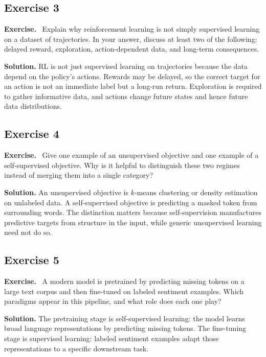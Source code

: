 \documentclass[11pt]{article}
\newenvironment{exercisebox}{\begin{framed}\noindent\textbf{Exercise.}\ }{\end{framed}}
\begin{document}
\subsection*{Exercise 3}
\begin{exercisebox}
Explain why reinforcement learning is not simply supervised learning on a dataset of trajectories. In your answer, discuss at least two of the following: delayed reward, exploration, action-dependent data, and long-term consequences.
\end{exercisebox}
\textbf{Solution.} RL is not just supervised learning on trajectories because the data depend on the policy's actions. Rewards may be delayed, so the correct target for an action is not an immediate label but a long-run return. Exploration is required to gather informative data, and actions change future states and hence future data distributions.

\subsection*{Exercise 4}
\begin{exercisebox}
Give one example of an unsupervised objective and one example of a self-supervised objective. Why is it helpful to distinguish these two regimes instead of merging them into a single category?
\end{exercisebox}
\textbf{Solution.} An unsupervised objective is $k$-means clustering or density estimation on unlabeled data. A self-supervised objective is predicting a masked token from surrounding words. The distinction matters because self-supervision manufactures predictive targets from structure in the input, while generic unsupervised learning need not do so.

\subsection*{Exercise 5}
\begin{exercisebox}
A modern model is pretrained by predicting missing tokens on a large text corpus and then fine-tuned on labeled sentiment examples. Which paradigms appear in this pipeline, and what role does each one play?
\end{exercisebox}
\textbf{Solution.} The pretraining stage is self-supervised learning: the model learns broad language representations by predicting missing tokens. The fine-tuning stage is supervised learning: labeled sentiment examples adapt those representations to a specific downstream task.
\end{document}
